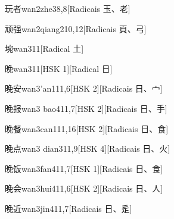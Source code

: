 \begin{entry}{玩者}{wan2zhe3}{8,8}[Radicais ⽟、⽼]
\end{entry}

\begin{entry}{顽强}{wan2qiang2}{10,12}[Radicais ⾴、⼸]
\end{entry}

\begin{entry}{埦}{wan3}{11}[Radical ⼟]
\end{entry}

\begin{entry}{晚}{wan3}{11}[HSK 1][Radical ⽇]
\end{entry}

\begin{entry}{晚安}{wan3'an1}{11,6}[HSK 2][Radicais ⽇、⼧]
\end{entry}

\begin{entry}{晚报}{wan3 bao4}{11,7}[HSK 2][Radicais ⽇、⼿]
\end{entry}

\begin{entry}{晚餐}{wan3can1}{11,16}[HSK 2][Radicais ⽇、⾷]
\end{entry}

\begin{entry}{晚点}{wan3 dian3}{11,9}[HSK 4][Radicais ⽇、⽕]
\end{entry}

\begin{entry}{晚饭}{wan3fan4}{11,7}[HSK 1][Radicais ⽇、⾷]
\end{entry}

\begin{entry}{晚会}{wan3hui4}{11,6}[HSK 2][Radicais ⽇、⼈]
\end{entry}

\begin{entry}{晚近}{wan3jin4}{11,7}[Radicais ⽇、⾡]
\end{entry}

